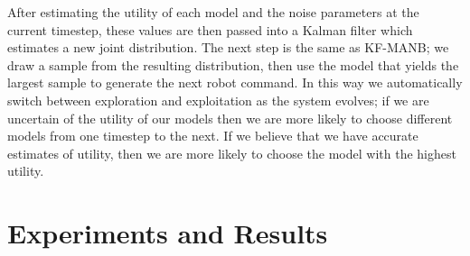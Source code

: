 After estimating the utility of each model and the noise parameters at the current timestep, these values are then passed into a Kalman filter which estimates a new joint distribution. The next step is the same as KF-MANB; we draw a sample from the resulting distribution, then use the model that yields the largest sample to generate the next robot command. In this way we automatically switch between exploration and exploitation as the system evolves; if we are uncertain of the utility of our models then we are more likely to choose different models from one timestep to the next. If we believe that we have accurate estimates of utility, then we are more likely to choose the model with the highest utility.


\section{Experiments and Results}

